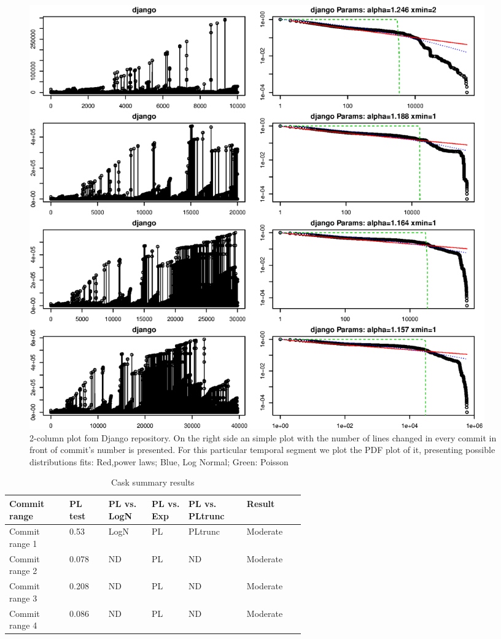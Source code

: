 \documentclass[conference]{IEEEtran}
\begin{document}
\begin{figure}[htbp]
  \centerline{\includegraphics[width=0.95\textwidth]{img/django_global_set.eps}}
  \caption{2-column plot fom Django repository. On the right side an
    simple plot with the number of lines changed in every commit in
    front of commit's number is presented. For this particular
    temporal segment we plot the PDF plot of it, presenting possible
    distributions fits: Red,power laws; Blue, Log Normal; Green:
    Poisson }
  \label{fig:django}
\end{figure}


\begin{table}[h!tbp]
  \caption{Cask summary results}
  \begin{center}
    \begin{tabular}{| p{0.12\linewidth} | p{0.08\linewidth} | p{0.08\linewidth} |
        p{0.08\linewidth} | p{0.1\linewidth} | p{0.1\linewidth}
         |}
      \hline
      Commit range & PL test&PL vs. LogN & PL vs. Exp & PL vs. PLtrunc & Result \\
      \hline
      Commit range 1 & 0.53& LogN & PL  & PLtrunc & Moderate \\
      Commit range 2& 0.078&ND & PL  & ND & Moderate \\
      Commit range 3& 0.208&ND  &  PL & ND & Moderate \\
      Commit range 4& 0.086&ND & PL  & ND & Moderate \\
      \hline

      \hline
    \end{tabular}
  \end{center}
  \label{tab:2019testscask}
\end{table}
\end{document}
